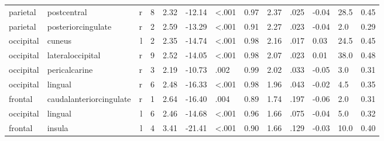 \documentclass{article}
\begin{document}
\begin{longtable}{llrR{1.5cm}R{1cm}R{1.3cm}R{1cm}R{1cm}R{1.3cm}R{1cm}R{1.8cm}R{1.3cm}R{1.8cm}}
  parietal &               postcentral &    r &            8 &                  2.32 &           -12.14 &      \textless.001 &                               0.97 &                          2.37 &                            .025 & -0.04 &   28.5 &      0.45 \\
  parietal &        posteriorcingulate &    r &            2 &                  2.59 &           -13.29 &      \textless.001 &                               0.91 &                          2.27 &                            .023 & -0.04 &    2.0 &      0.29 \\
 occipital &                    cuneus &    l &            2 &                  2.35 &           -14.74 &      \textless.001 &                               0.98 &                          2.16 &                            .017 &  0.03 &   24.5 &      0.45 \\
 occipital &          lateraloccipital &    r &            9 &                  2.52 &           -14.05 &      \textless.001 &                               0.98 &                          2.07 &                            .023 &  0.01 &   38.0 &      0.48 \\
 occipital &             pericalcarine &    r &            3 &                  2.19 &           -10.73 &               .002 &                               0.99 &                          2.02 &                            .033 & -0.05 &    3.0 &      0.31 \\
 occipital &                   lingual &    r &            6 &                  2.48 &           -16.33 &      \textless.001 &                               0.98 &                          1.96 &                            .043 & -0.02 &    4.5 &      0.35 \\
   frontal &   caudalanteriorcingulate &    r &            1 &                  2.64 &           -16.40 &               .004 &                               0.89 &                          1.74 &                            .197 & -0.06 &    2.0 &      0.31 \\
 occipital &                   lingual &    l &            6 &                  2.46 &           -14.68 &      \textless.001 &                               0.96 &                          1.66 &                            .075 & -0.04 &    5.0 &      0.32 \\
   frontal &                    insula &    l &            4 &                  3.41 &           -21.41 &      \textless.001 &                               0.90 &                          1.66 &                            .129 & -0.03 &   10.0 &      0.40 \\

\end{longtable}
\end{document}
